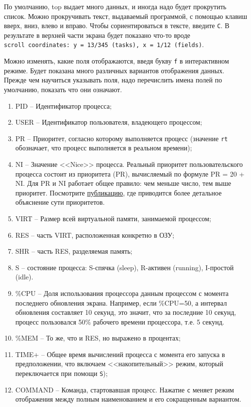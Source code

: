 \documentclass[12pt]{article}
\providecommand{\tightlist}{%
  \setlength{\itemsep}{0pt}\setlength{\parskip}{0pt}}
\begin{document}
По умолчанию, top выдает много данных, и иногда надо будет прокрутить
список. Можно прокручивать текст, выдаваемый программой, с помощью
клавиш вверх, вниз, влево и вправо. Чтобы сориентироваться в тексте,
введите \texttt{C}. В результате в верхней части экрана будет показано
что-то вроде
\texttt{scroll\ coordinates:\ y\ =\ 13/345\ (tasks),\ x\ =\ 1/12\ (fields)}.

Можно изменять, какие поля отображаются, введя букву \texttt{f} в
интерактивном режиме. Будет показана
много различных вариантов отображения данных. Прежде чем научиться
указывать поля, надо перечислить имена полей по умолчанию, показать что
они означают.
\begin{enumerate}
\tightlist
\item
  PID -- Идентификатор процесса;
\item
  USER -- Идентификатор пользователя, владеющего процессом;
\item
  PR -- Приоритет, согласно которому выполняется процесс (значение
  \texttt{rt} обозначает, что процесс выполняется в реальном времени);
\item
  NI -- Значение <<Nice>> процесса. Реальный приоритет пользовательского
  процесса состоит из приоритета (PR), вычисляемый по формуле PR = 20 +
  NI. Для PR и NI работает общее правило: чем меньше число, тем выше
  приоритет. Посмотрите
  \href{https://askubuntu.com/a/656787/917201}{публикацию}, где
  приводится более детальное объяснение сути приоритетов.
\item
  VIRT -- Размер всей виртуальной памяти, занимаемой процессом;
\item
  RES -- часть VIRT, расположенная конкретно в ОЗУ;
\item
  SHR -- часть RES, разделяемая память;
\item
  S -- состояние процесса: S-спячка (sleep), R-активен (running),
  I-простой (idle).
\item
  \%CPU -- Доля использования процессора данным процессом с момента
  последнего обновления экрана. Например, если \%CPU=50, а интервал
  обновления составляет 10 секунд, это значит, что за последние 10
  секунд, процесс пользовался 50\% рабочего времени процессора, т.е. 5
  секунд.
\item
  \%MEM -- То же, что и RES, но выражено в процентах;
\item
  TIME+ -- Общее время вычислений процесса с момента его запуска в
  предположении, что включаем <<накопительный>> режим, который
  переключается при помощи \texttt{S});
\item
  COMMAND -- Команда, стартовавшая процесс. Нажатие \texttt{c} меняет
  режим отображения между полным наименованием и его сокращенным
  вариантом.
\end{enumerate}
\end{document}
